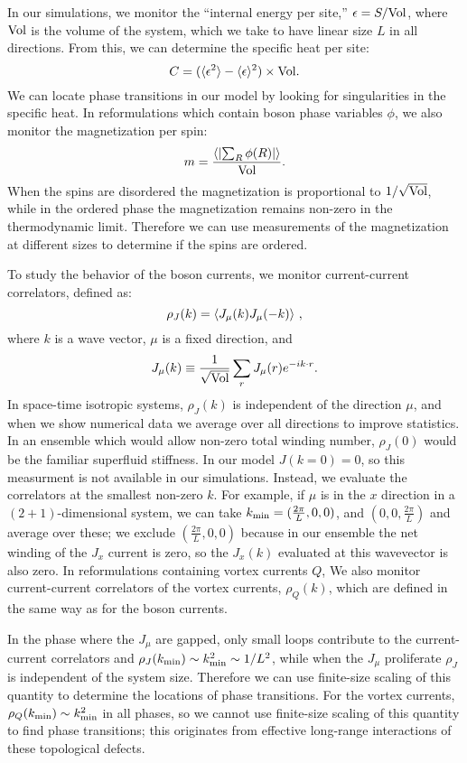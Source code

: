 In our simulations, we monitor the ``internal energy per site,'' $\epsilon= S /{\rm Vol}$, where ${\rm Vol}$ is the volume of the system, which we take to have linear size $L$ in all directions. From this, we can determine the specific heat per site:
\begin{equation}
C=(\langle \epsilon^2\rangle-\langle\epsilon\rangle^2)\times{\rm Vol}.
\end{equation}
We can locate phase transitions in our model by looking for singularities in the specific heat. In reformulations which contain boson phase variables $\phi$, we also monitor the magnetization per spin:
\begin{equation}
m = \frac{\left\langle \left|\sum_R \phi(R) \right|\right\rangle}{\rm Vol}.
\end{equation}
When the spins are disordered the magnetization is proportional to $1/\sqrt{\rm Vol}$, while in the ordered phase the magnetization remains non-zero in the thermodynamic limit. Therefore we can use measurements of the magnetization at different sizes to determine if the spins are ordered.

To study the behavior of the boson currents, we monitor current-current correlators, defined as:
\begin{equation}
\rho_{J}({k})=\langle J_\mu({k})J_\mu(-{k})\rangle ~,
\label{rho}
\end{equation}
where $k$ is a wave vector, $\mu$ is a fixed direction, and 
\begin{equation}
J_\mu({k})\equiv\frac{1}{\rm \sqrt{Vol}}\sum_r J_\mu(r)e^{-i{k}\cdot r}.
\end{equation}
In space-time isotropic systems, $\rho_J({k})$ is independent of the direction $\mu$, and when we show numerical data we average over all directions to improve statistics. In an ensemble which would allow non-zero total winding number, $\rho_J(0)$ would be the familiar superfluid stiffness. In our model $J(k=0)=0$, so this measurment is not available in our simulations. Instead, we evaluate the correlators at the smallest non-zero ${k}$.  For example, if $\mu$ is in the $x$ direction in a $(2+1)$-dimensional system, we can take ${k}_{\rm min}=(\frac{2\pi}{L},0,0)$, and $(0,0,\frac{2\pi}{L})$ and average over these; we exclude $(\frac{2\pi}{L},0,0)$ because in our ensemble the net winding of the $J_x$ current is zero, so the $J_x(k)$ evaluated at this wavevector is also zero. In reformulations containing vortex currents $Q$, We also monitor current-current correlators of the vortex currents, $\rho_Q(k)$, which are defined in the same way as for the boson currents.

In the phase where the $J_\mu$ are gapped, only small loops contribute to the current-current correlators and $\rho_J(k_{\rm min})\sim {k}_{\rm min}^2 \sim 1/L^2$, while when the $J_\mu$ proliferate $\rho_J$ is independent of the system size. Therefore we can use finite-size scaling of this quantity to determine the locations of phase transitions. For the vortex currents, $\rho_Q(k_{\rm min})\sim {k}_{\rm min}^2$ in all phases, so we cannot use finite-size scaling of this quantity to find phase transitions; this originates from effective long-range interactions of these topological defects.




